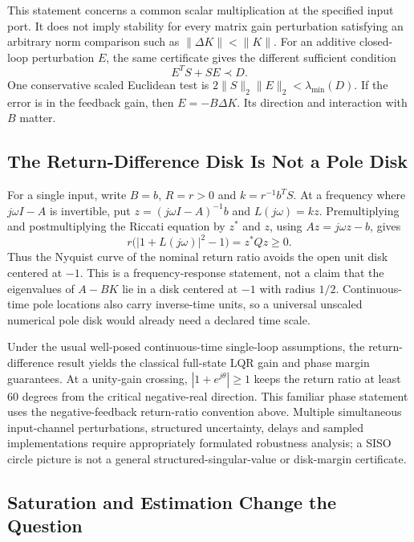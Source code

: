 This statement concerns a common scalar multiplication at the specified input port. It does not imply stability for every matrix gain perturbation satisfying an arbitrary norm comparison such as $\|\Delta K\|<\|K\|$. For an additive closed-loop perturbation $E$, the same certificate gives the different sufficient condition
\begin{equation}
E^TS+SE\prec D.
\end{equation}
One conservative scaled Euclidean test is $2\|S\|_2\|E\|_2<\lambda_{\min}(D)$. If the error is in the feedback gain, then $E=-B\Delta K$. Its direction and interaction with $B$ matter.

\subsection{The Return-Difference Disk Is Not a Pole Disk}

For a single input, write $B=b$, $R=r>0$ and $k=r^{-1}b^TS$. At a frequency where $j\omega I-A$ is invertible, put $z=(j\omega I-A)^{-1}b$ and $L(j\omega)=kz$. Premultiplying and postmultiplying the Riccati equation by $z^*$ and $z$, using $Az=j\omega z-b$, gives
\begin{equation}
r\bigl(|1+L(j\omega)|^2-1\bigr)=z^*Qz\ge0.
\end{equation}
Thus the Nyquist curve of the nominal return ratio avoids the open unit disk centered at $-1$. This is a frequency-response statement, not a claim that the eigenvalues of $A-BK$ lie in a disk centered at $-1$ with radius $1/2$. Continuous-time pole locations also carry inverse-time units, so a universal unscaled numerical pole disk would already need a declared time scale.

Under the usual well-posed continuous-time single-loop assumptions, the return-difference result yields the classical full-state LQR gain and phase margin guarantees. At a unity-gain crossing, $|1+e^{j\theta}|\ge1$ keeps the return ratio at least $60$ degrees from the critical negative-real direction. This familiar phase statement uses the negative-feedback return-ratio convention above. Multiple simultaneous input-channel perturbations, structured uncertainty, delays and sampled implementations require appropriately formulated robustness analysis; a SISO circle picture is not a general structured-singular-value or disk-margin certificate.

\subsection{Saturation and Estimation Change the Question}

